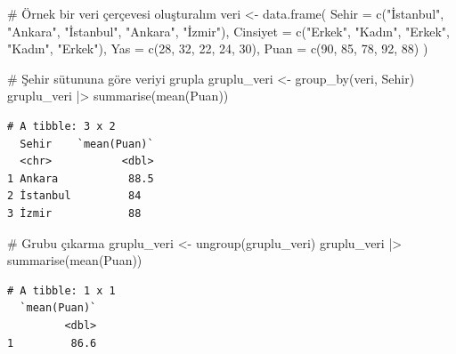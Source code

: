 \documentclass[
  letterpaper,
  DIV=11,
  numbers=noendperiod]{scrreprt}
\newenvironment{Shaded}{\begin{snugshade}}{\end{snugshade}}
\newcommand{\AttributeTok}[1]{\textcolor[rgb]{0.40,0.45,0.13}{#1}}
\newcommand{\CommentTok}[1]{\textcolor[rgb]{0.37,0.37,0.37}{#1}}
\newcommand{\DecValTok}[1]{\textcolor[rgb]{0.68,0.00,0.00}{#1}}
\newcommand{\FunctionTok}[1]{\textcolor[rgb]{0.28,0.35,0.67}{#1}}
\newcommand{\NormalTok}[1]{\textcolor[rgb]{0.00,0.23,0.31}{#1}}
\newcommand{\OtherTok}[1]{\textcolor[rgb]{0.00,0.23,0.31}{#1}}
\newcommand{\SpecialCharTok}[1]{\textcolor[rgb]{0.37,0.37,0.37}{#1}}
\newcommand{\StringTok}[1]{\textcolor[rgb]{0.13,0.47,0.30}{#1}}
\begin{document}
\begin{Shaded}
\begin{Highlighting}[]
\CommentTok{\# Örnek bir veri çerçevesi oluşturalım}
\NormalTok{veri }\OtherTok{\textless{}{-}} \FunctionTok{data.frame}\NormalTok{(}
  \AttributeTok{Sehir =} \FunctionTok{c}\NormalTok{(}\StringTok{"İstanbul"}\NormalTok{, }\StringTok{"Ankara"}\NormalTok{, }\StringTok{"İstanbul"}\NormalTok{, }\StringTok{"Ankara"}\NormalTok{, }\StringTok{"İzmir"}\NormalTok{),}
  \AttributeTok{Cinsiyet =} \FunctionTok{c}\NormalTok{(}\StringTok{"Erkek"}\NormalTok{, }\StringTok{"Kadın"}\NormalTok{, }\StringTok{"Erkek"}\NormalTok{, }\StringTok{"Kadın"}\NormalTok{, }\StringTok{"Erkek"}\NormalTok{),}
  \AttributeTok{Yas =} \FunctionTok{c}\NormalTok{(}\DecValTok{28}\NormalTok{, }\DecValTok{32}\NormalTok{, }\DecValTok{22}\NormalTok{, }\DecValTok{24}\NormalTok{, }\DecValTok{30}\NormalTok{),}
  \AttributeTok{Puan =} \FunctionTok{c}\NormalTok{(}\DecValTok{90}\NormalTok{, }\DecValTok{85}\NormalTok{, }\DecValTok{78}\NormalTok{, }\DecValTok{92}\NormalTok{, }\DecValTok{88}\NormalTok{)}
\NormalTok{)}

\CommentTok{\# Şehir sütununa göre veriyi grupla}
\NormalTok{gruplu\_veri }\OtherTok{\textless{}{-}} \FunctionTok{group\_by}\NormalTok{(veri, Sehir)}
\NormalTok{gruplu\_veri }\SpecialCharTok{|\textgreater{}} \FunctionTok{summarise}\NormalTok{(}\FunctionTok{mean}\NormalTok{(Puan))}
\end{Highlighting}
\end{Shaded}

\begin{verbatim}
# A tibble: 3 x 2
  Sehir    `mean(Puan)`
  <chr>           <dbl>
1 Ankara           88.5
2 İstanbul         84  
3 İzmir            88  
\end{verbatim}

\begin{Shaded}
\begin{Highlighting}[]
\CommentTok{\# Grubu çıkarma}
\NormalTok{gruplu\_veri }\OtherTok{\textless{}{-}} \FunctionTok{ungroup}\NormalTok{(gruplu\_veri)}
\NormalTok{gruplu\_veri }\SpecialCharTok{|\textgreater{}} \FunctionTok{summarise}\NormalTok{(}\FunctionTok{mean}\NormalTok{(Puan))}
\end{Highlighting}
\end{Shaded}

\begin{verbatim}
# A tibble: 1 x 1
  `mean(Puan)`
         <dbl>
1         86.6
\end{verbatim}
\end{document}
